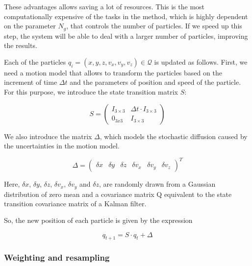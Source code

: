These advantages allows saving a lot of resources. This is the most computationally expensive of the tasks in the method, which is highly dependent on the parameter $N_g$, that controls the number of particles. If we speed up this step, the system will be able to deal with a larger number of particles, improving the results.

Each of the particles $q_i = (x, y, z, v_x, v_y, v_z) \in \mathcal{Q}$ is updated as follows. First, we need a motion model that allows to transform the particles based on the increment of time $\Delta t$ and the parameters of position and speed of the particle. For this purpose, we introduce the state transition matrix $S$:

\begin{equation}\label{eq:cp05_state_transition_matrix}
S =
\left( \begin{array}{cc}
I_{3\times3} & \Delta t \cdot I_{3\times3} \\
0_{3x3} & I_{3\times3} \end{array} \right)
\end{equation}

We also introduce the matrix $\Delta$, which models the stochastic diffusion caused by the uncertainties in the motion model.

\begin{equation}\label{eq:cp05_state_motion_model_uncertainties}
\Delta =
\left( \begin{array}{cccccc}
\delta x & \delta y & \delta z & \delta v_x & \delta v_y & \delta v_z
\end{array} \right)^T
\end{equation}

Here, $\delta x$, $\delta y$, $\delta z$, $\delta v_x$, $\delta v_y$ and $\delta z$, are randomly drawn from a Gaussian distribution of zero mean and a covariance matrix Q equivalent to the state transition covariance matrix of a Kalman filter.

So, the new position of each particle is given by the expression

\begin{equation}\label{eq:cp05_particle_update}
q_{t + 1} = S \cdot q_{t} + \Delta
\end{equation}

\FloatBarrier

\subsubsection{Weighting and resampling}\label{ch:chapter05_01_04_02}

